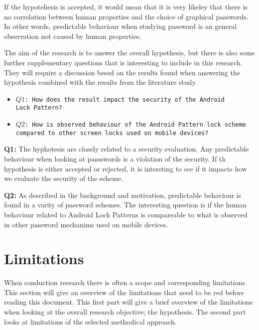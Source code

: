 	  If the hypotehesis is accepted, it would mean that it is very likeley that there is no correlation between human properties and the choice of graphical passwords. In other words, predictable behaviour when studying password is an general observation not caused by human properties.

		The aim of the research is to answer the overall hypothesis, but there is also some further supplementary questions that is interesting to include in this research. They will require a discussion besed on the results found when answering the hypothesis combined with the results from the literature study.

	  {\renewcommand\labelitemi{}
			\begin{itemize}
	  		\item \texttt{$Q1$: How does the result impact the security of the Android \\Lock Pattern?}
	  		\item \texttt{$Q2$: How is observed behaviour of the Android Pattern lock scheme \\compared to other screen locks used on mobile devices?}
	  	\end{itemize}
	  }

	  {\bf Q1:} The hyphotesis are closely related to a security evaluation. Any predictable behaviour when looking at passswords is a violation of the security. If th hypothesis is either accepted or rejected, it is intersting to see if it impacts how we evaluate the security of the scheme. 

	  {\bf Q2:} As described in the background and motivation, predictable behaviour is found in a varity of password schemes. The interesting question is if the human behaviour related to Android Lock Patterns is compareable to what is observed in other password mechanims used on mobile devices. 


	\section{Limitations}
		When conduction research there is often a scope and corresponding limitations. This section will give an overview of the limitations that need to be red before reading this document. This first part will give a brief overview of the limitations when looking at the overall research objective; the hypothesis. The second part looks at limitations of the selected methodical approach. 

